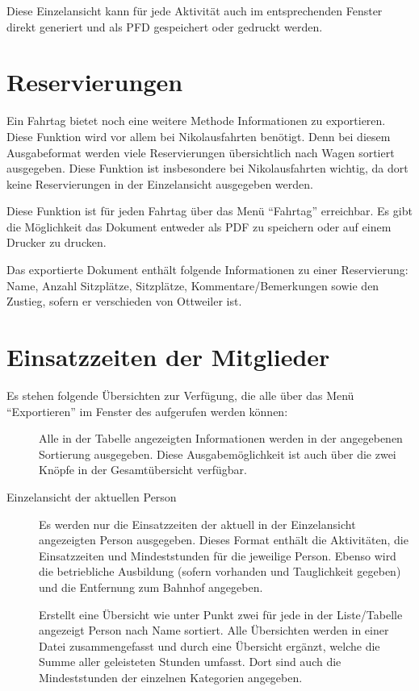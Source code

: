 Diese Einzelansicht kann für jede Aktivität auch im entsprechenden Fenster direkt generiert und als PFD gespeichert oder gedruckt werden.


\section{Reservierungen}
Ein Fahrtag bietet noch eine weitere Methode Informationen zu exportieren.
Diese Funktion wird vor allem bei Nikolausfahrten benötigt.
Denn bei diesem Ausgabeformat werden viele Reservierungen übersichtlich nach Wagen sortiert ausgegeben.
Diese Funktion ist insbesondere bei Nikolausfahrten wichtig, da dort keine Reservierungen in der Einzelansicht ausgegeben werden.

Diese Funktion ist für jeden Fahrtag über das Menü "`Fahrtag"' erreichbar.
Es gibt die Möglichkeit das Dokument entweder als PDF zu speichern oder auf einem Drucker zu drucken.

Das exportierte Dokument enthält folgende Informationen zu einer Reservierung: Name, Anzahl Sitzplätze, Sitzplätze, Kommentare/Bemerkungen sowie den Zustieg, sofern er verschieden von Ottweiler ist.



\section{Einsatzzeiten der Mitglieder}
Es stehen folgende Übersichten zur Verfügung, die alle über das Menü "`Exportieren"' im Fenster des  aufgerufen werden können:
\begin{description}
  \item[]
  Alle in der Tabelle angezeigten Informationen werden in der angegebenen Sortierung ausgegeben.
  Diese Ausgabemöglichkeit ist auch über die zwei Knöpfe in der Gesamtübersicht verfügbar.
  \item[Einzelansicht der aktuellen Person]
  Es werden nur die Einsatzzeiten der aktuell in der Einzelansicht angezeigten Person ausgegeben.
  Dieses Format enthält die Aktivitäten, die Einsatzzeiten und Mindeststunden für die jeweilige Person.
  Ebenso wird die betriebliche Ausbildung (sofern vorhanden und Tauglichkeit gegeben) und die Entfernung zum Bahnhof angegeben.
  \item[]
  Erstellt eine Übersicht wie unter Punkt zwei für jede in der Liste/Tabelle angezeigt Person nach Name sortiert.
  Alle Übersichten werden in einer Datei zusammengefasst und durch eine Übersicht ergänzt, welche die Summe aller geleisteten Stunden umfasst.
  Dort sind auch die Mindeststunden der einzelnen Kategorien angegeben.
\end{description}



